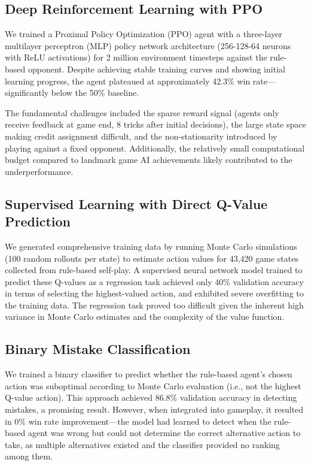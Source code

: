 \documentclass[conference]{IEEEtran}
\begin{document}
\subsection{Deep Reinforcement Learning with PPO}

We trained a Proximal Policy Optimization (PPO) agent \cite{schulman2017proximal} with a three-layer multilayer perceptron (MLP) policy network architecture (256-128-64 neurons with ReLU activations) for 2 million environment timesteps against the rule-based opponent. Despite achieving stable training curves and showing initial learning progress, the agent plateaued at approximately 42.3\% win rate—significantly below the 50\% baseline. 

The fundamental challenges included the sparse reward signal (agents only receive feedback at game end, 8 tricks after initial decisions), the large state space making credit assignment difficult, and the non-stationarity introduced by playing against a fixed opponent. Additionally, the relatively small computational budget compared to landmark game AI achievements likely contributed to the underperformance.

\subsection{Supervised Learning with Direct Q-Value Prediction}

We generated comprehensive training data by running Monte Carlo simulations (100 random rollouts per state) to estimate action values for 43,420 game states collected from rule-based self-play. A supervised neural network model trained to predict these Q-values as a regression task achieved only 40\% validation accuracy in terms of selecting the highest-valued action, and exhibited severe overfitting to the training data. The regression task proved too difficult given the inherent high variance in Monte Carlo estimates and the complexity of the value function.

\subsection{Binary Mistake Classification}

We trained a binary classifier to predict whether the rule-based agent's chosen action was suboptimal according to Monte Carlo evaluation (i.e., not the highest Q-value action). This approach achieved 86.8\% validation accuracy in detecting mistakes, a promising result. However, when integrated into gameplay, it resulted in 0\% win rate improvement—the model had learned to detect when the rule-based agent was wrong but could not determine the correct alternative action to take, as multiple alternatives existed and the classifier provided no ranking among them.
\end{document}
